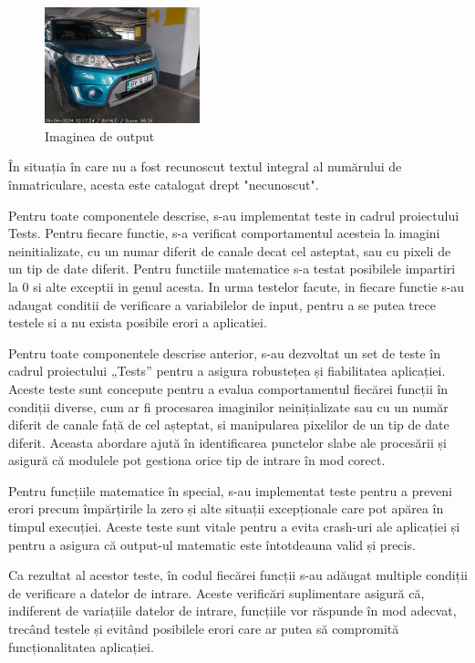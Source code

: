 \documentclass[a4paper,12pt]{report}
\begin{document}
\begin{figure}[h]
    \centering
    \includegraphics[width=0.4\textwidth]{images/output.jpg}
    \caption{Imaginea de output}
\end{figure}
\FloatBarrier

În situația în care nu a fost recunoscut textul integral al numărului de înmatriculare, acesta este catalogat drept "necunoscut".

Pentru toate componentele descrise, s-au implementat teste in cadrul proiectului Tests. Pentru fiecare functie, s-a verificat comportamentul acesteia la imagini neinitializate, cu un numar diferit de canale decat cel asteptat, sau cu pixeli de un tip de date diferit. Pentru functiile matematice s-a testat posibilele impartiri la 0 si alte exceptii in genul acesta. In urma testelor facute, in fiecare functie s-au adaugat conditii de verificare a variabilelor de input, pentru a se putea trece testele si a nu exista posibile erori a aplicatiei.

Pentru toate componentele descrise anterior, s-au dezvoltat un set de teste în cadrul proiectului „Tests” pentru a asigura robustețea și fiabilitatea aplicației. Aceste teste sunt concepute pentru a evalua comportamentul fiecărei funcții în condiții diverse, cum ar fi procesarea imaginilor neinițializate sau cu un număr diferit de canale față de cel așteptat, si manipularea pixelilor de un tip de date diferit. Aceasta abordare ajută în identificarea punctelor slabe ale procesării și asigură că modulele pot gestiona orice tip de intrare în mod corect.

Pentru funcțiile matematice în special, s-au implementat teste pentru a preveni erori precum împărțirile la zero și alte situații excepționale care pot apărea în timpul execuției. Aceste teste sunt vitale pentru a evita crash-uri ale aplicației și pentru a asigura că output-ul matematic este întotdeauna valid și precis.

Ca rezultat al acestor teste, în codul fiecărei funcții s-au adăugat multiple condiții de verificare a datelor de intrare. Aceste verificări suplimentare asigură că, indiferent de variațiile datelor de intrare, funcțiile vor răspunde în mod adecvat, trecând testele și evitând posibilele erori care ar putea să compromită funcționalitatea aplicației.
\end{document}
